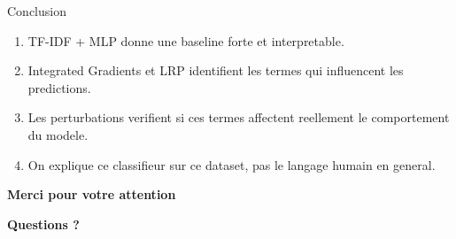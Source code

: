 \documentclass[10pt]{beamer}
\begin{document}
\begin{frame}{Conclusion}
    \begin{tcolorbox}[colback=lightred!20, colframe=redforsnnu, title=Messages a retenir]
        \begin{enumerate}\small
            \item TF-IDF + MLP donne une baseline forte et interpretable.
            \item Integrated Gradients et LRP identifient les termes qui influencent les predictions.
            \item Les perturbations verifient si ces termes affectent reellement le comportement du modele.
            \item On explique ce classifieur sur ce dataset, pas le langage humain en general.
        \end{enumerate}
    \end{tcolorbox}
\end{frame}

\begin{frame}[plain]
    \centering
    \vfill
    {\Large\textbf{Merci pour votre attention}\par}
    \vspace{0.8cm}
    {\Huge\textbf{Questions ?}\par}
    \vfill
\end{frame}
\end{document}
